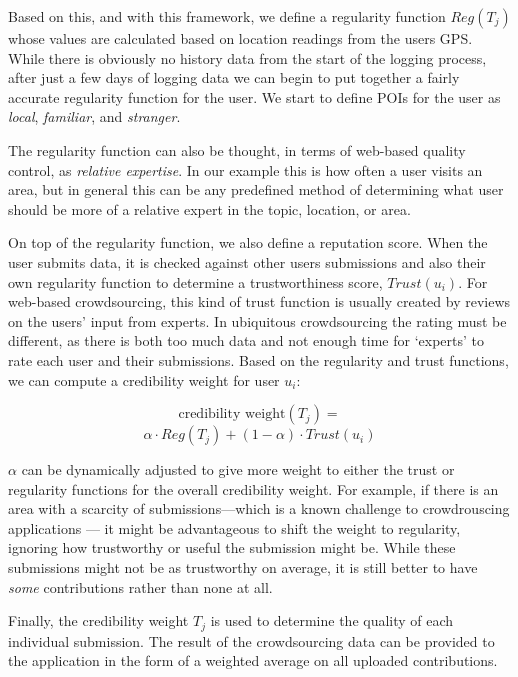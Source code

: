 \documentclass{sig-alternate-05-2015}
\begin{document}
	Based on this, and with this framework, we define a regularity function $Reg(T_j)$ whose values are calculated based on location readings from the users GPS.
	While there is obviously no history data from the start of the logging process, after just a few days of logging data we can begin to put together a fairly accurate regularity function for the user. We start to define POIs for the user as \emph{local}, \emph{familiar}, and \emph{stranger}. 
	
	The regularity function can also be thought, in terms of web-based quality control, as \emph{relative expertise}. In our example this is how often a user visits an area, but in general this can be any predefined method of determining what user should be more of a relative expert in the topic, location, or area.
	
	On top of the regularity function, we also define a reputation score. When the user submits data, it is checked against other users submissions and also their own regularity function to determine a trustworthiness score, $Trust(u_i)$. For web-based crowdsourcing, this kind of trust function is usually created by reviews on the users' input from experts. In ubiquitous crowdsourcing the rating must be different, as there is both too much data and not enough time for `experts' to rate each user and their submissions. Based on the regularity and trust functions, we can compute a credibility weight for user $u_i$:
	
	$$\text{credibility weight} (T_j) = $$ 
	$$\alpha \cdot Reg(T_j) + (1 - \alpha) \cdot Trust(u_i)$$
	
	$\alpha$ can be dynamically adjusted to give more weight to either the trust or regularity functions for the overall credibility weight. For example, if there is an area with a scarcity of submissions---which is a known challenge to crowdrouscing applications \cite{doan2011crowdsourcing}--- it might be advantageous to shift the weight to regularity, ignoring how trustworthy or useful the submission might be. While these submissions might not be as trustworthy on average, it is still better to have \emph{some} contributions rather than none at all. 
	
	Finally, the credibility weight $T_j$ is used to determine the quality of each individual submission. The result of the crowdsourcing data can be provided to the application in the form of a weighted average on all uploaded contributions.
	
\end{document}
